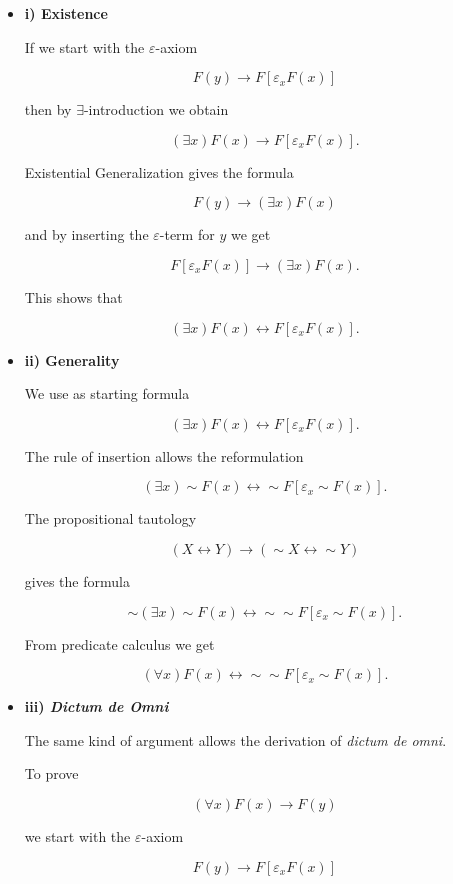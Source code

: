 \documentclass[12pt]{article}
\begin{document}
\begin{enumerate}
\begin{itemize} 

\item \textbf{i) Existence}

If we start with the $\varepsilon$-axiom

$$F (y) \to F [\varepsilon_{x} F (x)]$$

then by $\exists$-introduction we obtain

$$(\exists x) F (x) \to F [\varepsilon_x F (x)].$$

Existential Generalization gives the formula 

$$F (y) \to (\exists x) F (x)$$

and by inserting the $\varepsilon$-term for $y$ we get 

$$F [\varepsilon_{x} F (x)] \to (\exists x) F (x).$$

This shows that 

$$(\exists x) F (x) \leftrightarrow F [\varepsilon_{x} F (x)].$$

\item \textbf{ii) Generality}

We use as starting formula

$$(\exists x) F (x) \leftrightarrow F [\varepsilon_{x} F (x)].$$

The rule of insertion allows the reformulation
 
$$(\exists x) \sim F (x) \leftrightarrow \sim F [\varepsilon_{x} \sim F (x)].$$

The propositional tautology 

$$(X \leftrightarrow Y) \to (\sim X \leftrightarrow \sim Y)$$

gives the formula

$$\sim (\exists x) \sim F (x) \leftrightarrow \sim \sim F [\varepsilon_{x} \sim F (x)].$$

From predicate calculus we get

$$(\forall x) F (x) \leftrightarrow \sim \sim F [\varepsilon_{x} \sim F (x)].$$

\item \textbf{iii) \emph{Dictum de Omni}}

The same kind of argument allows the derivation of \emph{dictum de omni}.

To prove 

$$(\forall x) F (x) \to F (y)$$
 
we start with the $\varepsilon$-axiom

$$F (y) \to F [\varepsilon_{x} F (x)]$$ 


\end{itemize}
\end{enumerate}
\end{document}
